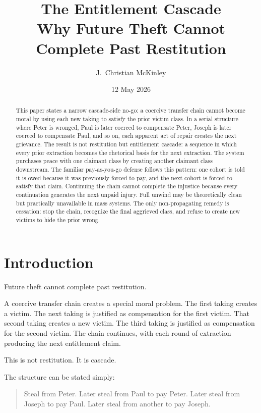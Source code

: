 \documentclass[12pt]{article}
\title{\textbf{The Entitlement Cascade}\\
\large Why Future Theft Cannot Complete Past Restitution}
\author{J.\ Christian McKinley}
\date{12 May 2026}
\begin{document}
\maketitle

\begingroup
\endgroup

\begin{abstract}
This paper states a narrow cascade-side no-go: a coercive transfer chain cannot become moral by using each new taking to satisfy the prior victim class. In a serial structure where Peter is wronged, Paul is later coerced to compensate Peter, Joseph is later coerced to compensate Paul, and so on, each apparent act of repair creates the next grievance. The result is not restitution but entitlement cascade: a sequence in which every prior extraction becomes the rhetorical basis for the next extraction. The system purchases peace with one claimant class by creating another claimant class downstream. The familiar pay-as-you-go defense follows this pattern: one cohort is told it is owed because it was previously forced to pay, and the next cohort is forced to satisfy that claim. Continuing the chain cannot complete the injustice because every continuation generates the next unpaid injury. Full unwind may be theoretically clean but practically unavailable in mass systems. The only non-propagating remedy is cessation: stop the chain, recognize the final aggrieved class, and refuse to create new victims to hide the prior wrong.
\end{abstract}

\section{Introduction}

Future theft cannot complete past restitution.

A coercive transfer chain creates a special moral problem. The first taking creates a victim. The next taking is justified as compensation for the first victim. That second taking creates a new victim. The third taking is justified as compensation for the second victim. The chain continues, with each round of extraction producing the next entitlement claim.

This is not restitution. It is cascade.

The structure can be stated simply:

\begin{quote}
Steal from Peter. Later steal from Paul to pay Peter. Later steal from Joseph to pay Paul. Later steal from another to pay Joseph.
\end{quote}
\end{document}
